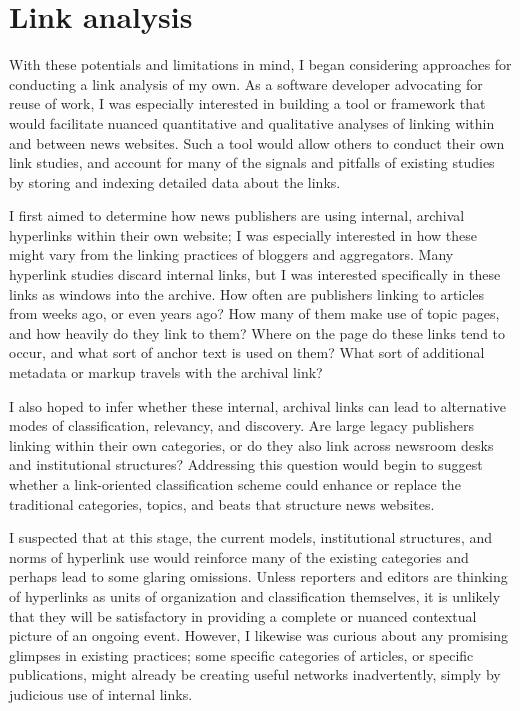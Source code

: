 \section{Link analysis}

With these potentials and limitations in mind, I began considering approaches for conducting a link analysis of my own. As a software developer advocating for reuse of work, I was especially interested in building a tool or framework that would facilitate nuanced quantitative and qualitative analyses of linking within and between news websites. Such a tool would allow others to conduct their own link studies, and account for many of the signals and pitfalls of existing studies by storing and indexing detailed data about the links.


I first aimed to determine how news publishers are using internal, archival hyperlinks within their own website; I was especially interested in how these might vary from the linking practices of bloggers and aggregators. Many hyperlink studies discard internal links, but I was interested specifically in these links as windows into the archive. How often are publishers linking to articles from weeks ago, or even years ago? How many of them make use of topic pages, and how heavily do they link to them? Where on the page do these links tend to occur, and what sort of anchor text is used on them? What sort of additional metadata or markup travels with the archival link?

I also hoped to infer whether these internal, archival links can lead to alternative modes of classification, relevancy, and discovery. Are large legacy publishers linking within their own categories, or do they also link across newsroom desks and institutional structures? Addressing this question would begin to suggest whether a link-oriented classification scheme could enhance or replace the traditional categories, topics, and beats that structure news websites.

I suspected that at this stage, the current models, institutional structures, and norms of hyperlink use would reinforce many of the existing categories and perhaps lead to some glaring omissions. Unless reporters and editors are thinking of hyperlinks as units of organization and classification themselves, it is unlikely that they will be satisfactory in providing a complete or nuanced contextual picture of an ongoing event. However, I likewise was curious about any promising glimpses in existing practices; some specific categories of articles, or specific publications, might already be creating useful networks inadvertently, simply by judicious use of internal links.

